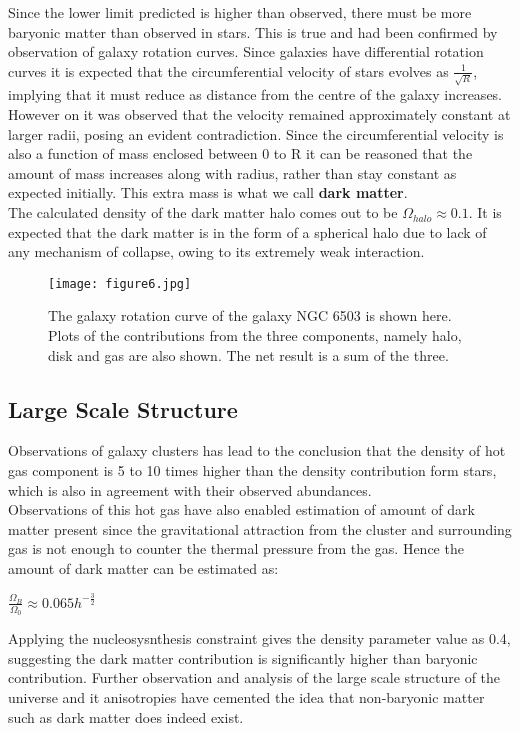 \documentclass{article}
\begin{document}
Since the lower limit predicted is higher than observed, there must be more baryonic matter than observed in stars. This is true and had been confirmed by observation of galaxy rotation curves. Since galaxies have differential rotation curves it is expected that the circumferential velocity of stars evolves as $\frac{1}{\sqrt{R}}$, implying that it must reduce as distance from the centre of the galaxy increases. However on it was observed that the velocity remained approximately constant at larger radii, posing an evident contradiction. Since the circumferential velocity is also a function of mass enclosed between 0 to R it can be reasoned that the amount of mass increases along with radius, rather than stay constant as expected initially. This extra mass is what we call \textbf{dark matter}. 
\\
The calculated density of the dark matter halo comes out to be $\Omega_{halo} \approx 0.1$. It is expected that the dark matter is in the form of a spherical halo due to lack of any mechanism of collapse, owing to its extremely weak interaction.

\begin{figure}[H]
    \centering
    \texttt{[image: figure6.jpg]}
    \caption{The galaxy rotation curve of the galaxy NGC 6503 is shown here. Plots of the contributions from the three components, namely halo, disk and gas are also shown. The net result is a sum of the three.}
    \label{fig:curvesrotation}
\end{figure}

\subsection{Large Scale Structure}
Observations of galaxy clusters has lead to the conclusion that the density of hot gas component is 5 to 10 times higher than the density contribution form stars, which is also in agreement with their observed abundances.
\\
Observations of this hot gas have also enabled estimation of amount of dark matter present since the gravitational attraction from the cluster and surrounding gas is not enough to counter the thermal pressure from the gas. Hence the amount of dark matter can be estimated as:

\begin{center}
   $\frac{\Omega_B}{\Omega_0} \approx 0.065 h^{-\frac{3}{2}}$
\end{center}

Applying the nucleosysnthesis constraint gives the density parameter value as 0.4, suggesting the dark matter contribution is significantly higher than baryonic contribution. Further observation and analysis of the large scale structure of the universe and it anisotropies have cemented the idea that non-baryonic matter such as dark matter does indeed exist.
\end{document}
